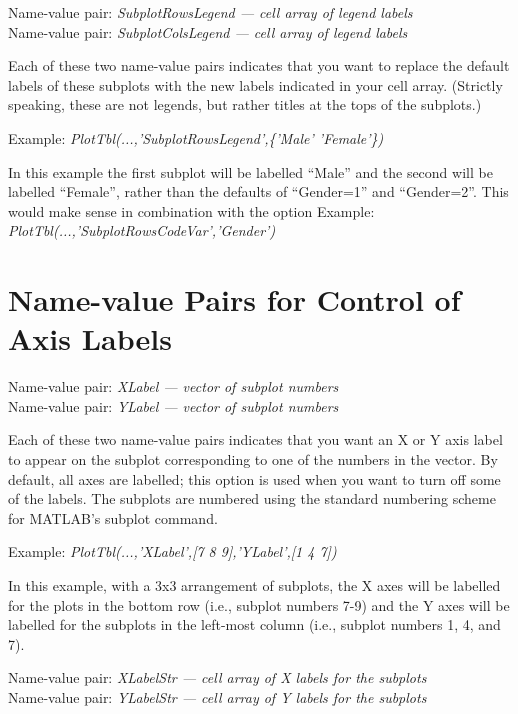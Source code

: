 \documentclass{article}
\newcommand{\example}[1]{Example: {\it #1}}
\newcommand{\namevalue}[2]{{\it #1 --- #2}}
\begin{document}

Name-value pair: \namevalue{SubplotRowsLegend}{cell array of legend labels} \\
Name-value pair: \namevalue{SubplotColsLegend}{cell array of legend labels}

Each of these two name-value pairs indicates that you want to replace the default labels
of these subplots with the new labels indicated in your cell array.
(Strictly speaking, these are not legends, but rather titles at
the tops of the subplots.)

\example{PlotTbl(...,'SubplotRowsLegend',\{'Male' 'Female'\})}

In this example the first subplot will be labelled ``Male''
and the second will be labelled ``Female'', rather than the defaults of ``Gender=1'' and ``Gender=2''.
This would make sense in combination with the option
\example{PlotTbl(...,'SubplotRowsCodeVar','Gender')}

\section{Name-value Pairs for Control of Axis Labels}

Name-value pair: \namevalue{XLabel}{vector of subplot numbers} \\
Name-value pair: \namevalue{YLabel}{vector of subplot numbers}

Each of these two name-value pairs indicates that you want an X or Y axis label to appear
on the subplot corresponding to one of the numbers in the vector.
By default, all axes are labelled; this option is used when you want to turn off
some of the labels.
The subplots are numbered using the standard numbering scheme for MATLAB's subplot command.

\example{PlotTbl(...,'XLabel',[7 8 9],'YLabel',[1 4 7])}

In this example, with a 3x3 arrangement of subplots, the X axes will
be labelled for the plots in the bottom row (i.e., subplot numbers 7-9) and the Y axes
will be labelled for the subplots in the left-most column (i.e., subplot numbers 1, 4, and 7).

Name-value pair: \namevalue{XLabelStr}{cell array of X labels for the subplots} \\
Name-value pair: \namevalue{YLabelStr}{cell array of Y labels for the subplots}
\end{document}
